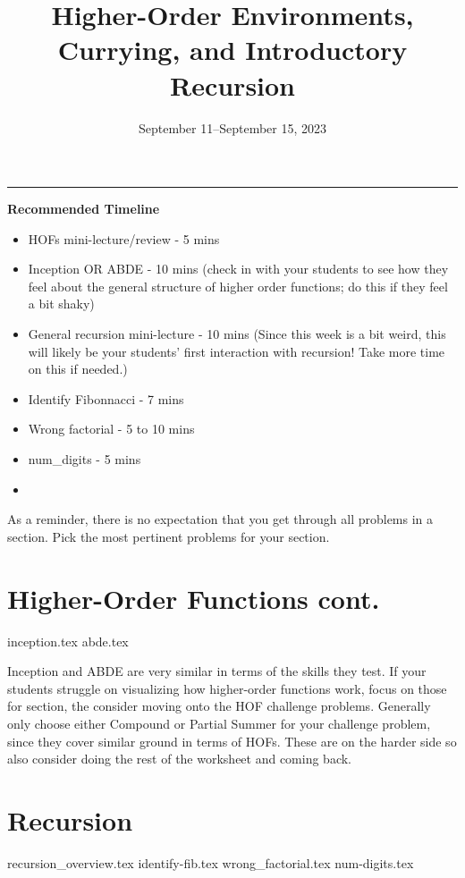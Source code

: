 \documentclass{exam}
\title{Higher-Order Environments, Currying, and Introductory Recursion}
\date{September 11--September 15, 2023}
\begin{document}
\maketitle
\rule{\textwidth}{0.15em}
\fontsize{12}{15}\selectfont

\begin{meta}
\textbf{Recommended Timeline}
\begin{itemize}
    \item HOFs mini-lecture/review - 5 mins
    \item Inception OR ABDE - 10 mins (check in with your students to see how they feel about the general structure of higher order functions; do this if they feel a bit shaky)
    \item General recursion mini-lecture - 10 mins (Since this week is a bit weird, this will likely be your students' first interaction with recursion! Take more time on this if needed.)
    \item Identify Fibonnacci - 7 mins
    \item Wrong factorial - 5 to 10 mins
    \item num\_digits - 5 mins
    \item
\end{itemize}
As a reminder, there is no expectation that you get through all problems in a section. Pick the most pertinent problems for your section. 
\end{meta}

\begin{questions}
    \section{Higher-Order Functions cont.}
    {inception.tex}
    {abde.tex}
    \begin{questionmeta}
        Inception and ABDE are very similar in terms of the skills they test. If your students struggle on visualizing how higher-order functions work, focus on those for section, the consider moving onto the HOF challenge problems.
        Generally only choose either Compound or Partial Summer for your challenge problem, since they cover similar ground in terms of HOFs. These are on the harder side so also consider doing the rest of the worksheet and coming back.
    \end{questionmeta}

    \section{Recursion}
    {recursion_overview.tex}
    {identify-fib.tex}
    {wrong_factorial.tex}
    {num-digits.tex}
\end{questions}
\end{document}

